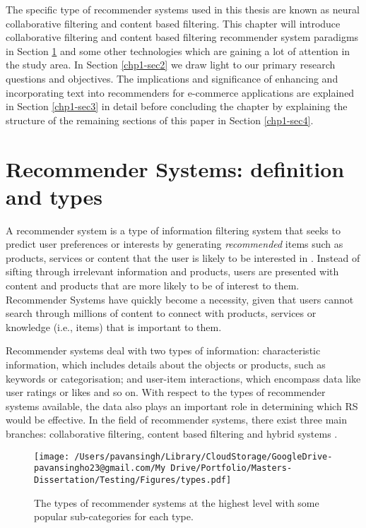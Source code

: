 The specific type of recommender systems used in this thesis are known as neural collaborative filtering and content based filtering. This chapter will introduce collaborative filtering and content based filtering recommender system paradigms in Section \ref{chp1-sec1} and some other technologies which are gaining a lot of attention in the study area. In Section \ref{chp1-sec2} we draw light to our primary research questions and objectives. The implications and significance of enhancing and incorporating text into recommenders for e-commerce applications are explained in Section \ref{chp1-sec3} in detail before concluding the chapter by explaining the structure of the remaining sections of this paper in Section \ref{chp1-sec4}.



\section{Recommender Systems: definition and types}
\label{chp1-sec1}

A recommender system is a type of information filtering system that seeks to predict user preferences or interests by generating \textit{recommended} items such as products, services or content that the user is likely to be interested in \citep{seth2022comparative}. Instead of sifting through irrelevant information and products, users are presented with content and products that are more likely to be of interest to them. Recommender Systems have quickly become a necessity, given that users cannot search through millions of content to connect with products, services or knowledge (i.e., items) that is important to them. 

Recommender systems deal with two types of information: characteristic information, which includes details about the objects or products, such as keywords or categorisation; and user-item interactions, which encompass data like user ratings or likes and so on.  With respect to the types of recommender systems available, the data also plays an important role in determining which RS would be effective. In the field of recommender systems, there exist three main branches: collaborative filtering, content based filtering and hybrid systems \citep{thorat2015survey}.

\begin{figure}[ht]
    \centering
    \texttt{[image: /Users/pavansingh/Library/CloudStorage/GoogleDrive-pavansingho23@gmail.com/My Drive/Portfolio/Masters-Dissertation/Testing/Figures/types.pdf]}
    \caption{The types of recommender systems at the highest level with some popular sub-categories for each type.}
    \label{fig:types_rs}
\end{figure}

